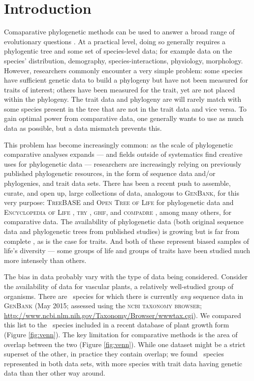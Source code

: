 \documentclass[a4paper,11pt]{article}
\begin{document}
\vfill

\newpage

\section{Introduction}

Comaparative phylogenetic methods can be used to answer a broad range of evolutionary questions \citep[e.g.][]{omeara-2012}.  At a practical level, doing so generally requires a phylogentic tree and some set of species-level data; for example data on the species' distribution, demography, species-interactions, physiology, morphology. However, researchers commonly encounter a very simple problem: some species have sufficient genetic data to build a phylogeny but have not been measured for traits of interest; others have been measured for the trait, yet are not placed within the phylogeny. The trait data and phylogeny are will rarely match with some species present in the tree that are not in the trait data and vice versa.  To gain optimal power from comparative data, one generally wants to use as much data as possible, but a data mismatch prevents this.

This problem has become increasingly common: as the scale of phylogenetic comparative analyses expands --- and fields outside of systematics find creative uses for phylogenetic data --- researchers are increasingly relying on previously published phylogenetic resources, in the form of sequence data and/or phylogenies, and trait data sets. There has been a recent push to assemble, curate, and open up, large collections of data, analogous to \textsc{GenBank}, for this very purpose: \textsc{TreeBASE} \citep{treebase} and \textsc{Open Tree of Life} \citep{OpenTree} for phylogenetic data and \textsc{Encyclopedia of Life} \citep{eol}, \textsc{try} \citep{try}, \textsc{gbif}, and \textsc{compadre} \citep{salguero2015}, among many others, for comparative data.  The availability of phylogenetic data (both original sequence data and phylogenetic trees from published studies) is growing but is far from complete \citep{hinchliff2014}, as is the case for traits. And both of these represent biased samples of life's diversity --- some groups of life and groups of traits have been studied much more intensely than others.

The bias in data probably vary with the type of data being considered. Consider the availability of data for vascular plants, a relatively well-studied group of organisms. There are \ngenbank\ species for which there is currently \emph{any} sequence data in \textsc{GenBank} (May 2015; assessed using the \textsc{ncbi taxonomy browser}; \url{http://www.ncbi.nlm.nih.gov/Taxonomy/Browser/wwwtax.cgi}). We compared this list to the \nwoody\ species included in a recent database of plant growth form \citep{Zanne} (Figure \ref{fig:venn}). The key limitation for comparative methods is the area of overlap between the two (Figure \ref{fig:venn}).  While one dataset might be a strict superset of the other, in practice they contain overlap; we found \noverlap\ species represented in both data sets, with more species with trait data having genetic data than ther other way around.
\end{document}
